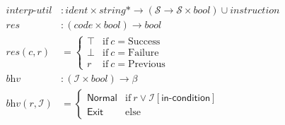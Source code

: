 \documentclass{scrartcl}
\newcommand{\get}[2]{#1[{\textsf{#2}}]}
\newcommand{\inp}{\mathcal I}
\newcommand{\sta}{\mathcal S}
\newcommand{\bnormal}{\textsf{Normal}}
\newcommand{\bexit}{\textsf{Exit}}
\newcommand{\bool}{\textit{bool}}
\newcommand{\func}[1]{\textit{#1}}
\begin{document}
\begin{align*}
  \func{interp-util}&: \textit{ident} \times \textit{string}* \rightarrow (\sta \rightarrow \sta \times \bool) \cup \textit{instruction} \\
  \func{res} &: (\textit{code} \times \textit{bool}) \rightarrow \textit{bool} \\
  \func{res}(c, r) &= \left\{\begin{array}{ll}\top & \text{if}\ c = \text{Success} \\ \bot & \text{if}\ c = \text{Failure} \\ r & \text{if}\ c = \text{Previous}\end{array}\right. \\
  \func{bhv} &: (\inp \times \textit{bool}) \rightarrow \beta \\
  \func{bhv}(r, \inp) &= \left\{\begin{array}{ll}\bnormal & \text{if}\ r \lor \get\inp{in-condition} \\ \bexit & \text{else}\end{array}\right.\\
\end{align*}
\end{document}
